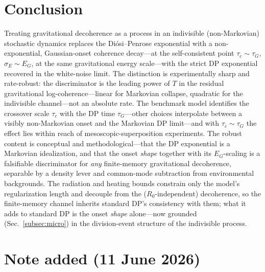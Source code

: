 \documentclass[aps,prd,onecolumn,amsmath,amssymb,nofootinbib,superscriptaddress]{revtex4-2}
\begin{document}
\section{Conclusion}\label{sec:conclusion}

Treating gravitational decoherence as a process in an indivisible (non-Markovian) stochastic dynamics
replaces the Di\'osi--Penrose exponential with a non-exponential, Gaussian-onset coherence
decay---at the self-consistent point $\tau_c\sim\tau_G$, $\sigma_E\sim E_G$, at the same gravitational
energy scale---with the strict DP exponential recovered in the white-noise limit. The distinction is
experimentally sharp and rate-robust: the discriminator is the leading power of $T$ in the residual
gravitational log-coherence---linear for Markovian collapse, quadratic for the indivisible
channel---not an absolute rate. The benchmark model identifies the crossover scale $\tau_c$ with the
DP time $\tau_G$---other choices interpolate between a visibly non-Markovian onset and the Markovian
DP limit---and with $\tau_c\sim\tau_G$ the effect lies within reach of mesoscopic-superposition
experiments. The robust content is conceptual and methodological---that the DP exponential is a
Markovian idealization, and that the onset \emph{shape} together with its $E_G$-scaling is a
falsifiable discriminator for \emph{any} finite-memory gravitational decoherence, separable by a
density lever and common-mode subtraction from environmental backgrounds. The radiation and heating
bounds constrain only the model's regularization length and decouple from the ($R_0$-independent)
decoherence, so the finite-memory channel inherits standard DP's consistency with them; what it adds to
standard DP is the onset \emph{shape} alone---now grounded (Sec.~\ref{subsec:micro}) in the
division-event structure of the indivisible process.


\section*{Note added (11 June 2026)}
\end{document}

